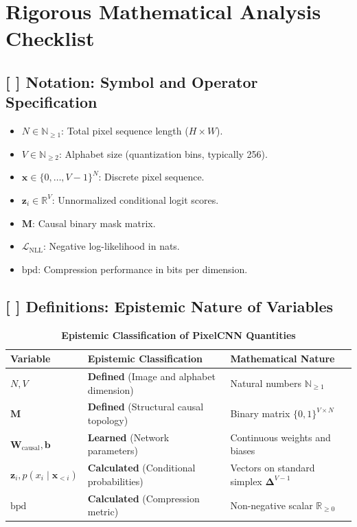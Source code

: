 \documentclass[11pt,a4paper]{article}
\theoremstyle{definition}
\begin{document}
\section{Rigorous Mathematical Analysis Checklist}

\subsection{[ ] Notation: Symbol and Operator Specification}
\begin{itemize}
    \item $N \in \mathbb{N}_{\ge 1}$: Total pixel sequence length ($H \times W$).
    \item $V \in \mathbb{N}_{\ge 2}$: Alphabet size (quantization bins, typically 256).
    \item $\mathbf{x} \in \{0, \dots, V-1\}^N$: Discrete pixel sequence.
    \item $\mathbf{z}_i \in \mathbb{R}^V$: Unnormalized conditional logit scores.
    \item $\mathbf{M}$: Causal binary mask matrix.
    \item $\mathcal{L}_{\text{NLL}}$: Negative log-likelihood in nats.
    \item $\text{bpd}$: Compression performance in bits per dimension.
\end{itemize}

\subsection{[ ] Definitions: Epistemic Nature of Variables}
\begin{table}[h]
\centering
\caption{\textbf{Epistemic Classification of PixelCNN Quantities}}
\begin{tabular}{lll}
\toprule
\textbf{Variable} & \textbf{Epistemic Classification} & \textbf{Mathematical Nature} \\
\midrule
$N, V$ & \textbf{Defined} (Image and alphabet dimension) & Natural numbers $\mathbb{N}_{\ge 1}$ \\
$\mathbf{M}$ & \textbf{Defined} (Structural causal topology) & Binary matrix $\{0, 1\}^{V \times N}$ \\
$\mathbf{W}_{\text{causal}}, \mathbf{b}$ & \textbf{Learned} (Network parameters) & Continuous weights and biases \\
$\mathbf{z}_i, p(x_i \mid \mathbf{x}_{<i})$ & \textbf{Calculated} (Conditional probabilities) & Vectors on standard simplex $\boldsymbol{\Delta}^{V-1}$ \\
$\text{bpd}$ & \textbf{Calculated} (Compression metric) & Non-negative scalar $\mathbb{R}_{\ge 0}$ \\
\bottomrule
\end{tabular}
\end{table}
\end{document}
